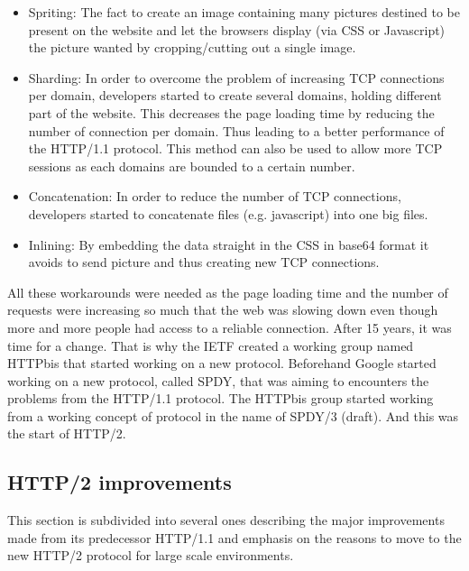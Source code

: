 \begin{itemize}
\item Spriting: The fact to create an image containing many pictures destined to be present on the website and let the browsers display (via CSS or Javascript) the picture wanted by cropping/cutting out a single image.
\item Sharding: In order to overcome the problem of increasing TCP connections per domain, developers started to create several domains, holding different part of the website. This decreases the page loading time by reducing the number of connection per domain. Thus leading to a better performance of the HTTP/1.1 protocol. This method can also be used to allow more TCP sessions as each domains are bounded to a certain number.
\item Concatenation: In order to reduce the number of TCP connections, developers started to concatenate files (e.g. javascript) into one big files. 
\item Inlining: By embedding the data straight in the CSS in base64 format it avoids to send picture and thus creating new TCP connections. 
\end{itemize}
All these workarounds were needed as the page loading time and the number of requests were increasing so much that the web was slowing down even though more and more people had access to a reliable connection. After 15 years, it was time for a change. That is why the IETF created a working group named HTTPbis that started working on a new protocol. Beforehand Google started working on a new protocol, called SPDY, that was aiming to encounters the problems from the HTTP/1.1 protocol. The HTTPbis group started working from a working concept of protocol in the name of SPDY/3 (draft). And this was the start of HTTP/2.

\subsection{HTTP/2 improvements}
This section is subdivided into several ones describing the major improvements made from its predecessor HTTP/1.1 and emphasis on the reasons to move to the new HTTP/2 protocol for large scale environments. 

